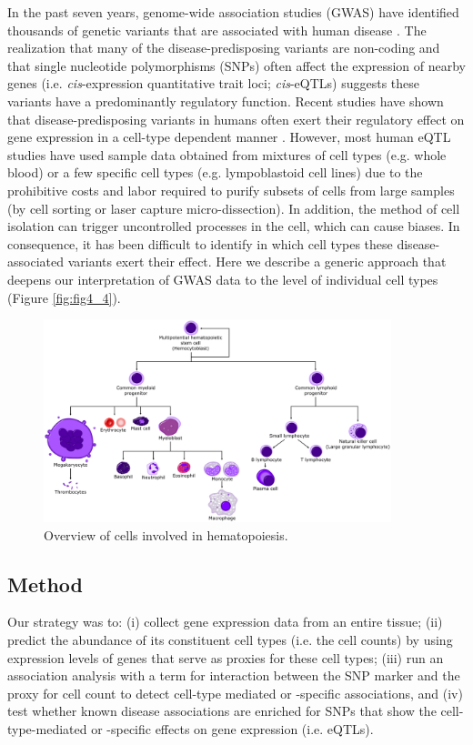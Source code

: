   In the past seven years, genome-wide association studies (GWAS) have identified thousands of genetic variants that are 
  associated with human disease \cite{Hindorff:2009}. The realization that many of the disease-predisposing variants are non-coding and that 
  single nucleotide polymorphisms (SNPs) often affect the expression of nearby genes (i.e. \emph{cis}-expression quantitative 
  trait loci; \emph{cis}-eQTLs)\cite{Lude:2011} suggests these variants have a predominantly regulatory function. Recent studies have shown 
  that disease-predisposing variants in humans often exert their regulatory effect on gene expression in a cell-type 
  dependent manner \cite{Brown:2013, Fairfax:2012, Fu:2012}. However, most human eQTL studies have used sample data obtained from mixtures of cell types (e.g. 
  whole blood) or a few specific cell types (e.g. lympoblastoid cell lines) due to the prohibitive costs and labor 
  required to purify subsets of cells from large samples (by cell sorting or laser capture micro-dissection). In addition, 
  the method of cell isolation can trigger uncontrolled processes in the cell, which can cause biases. In consequence, 
  it has been difficult to identify in which cell types these disease-associated variants exert their effect. 
  Here we describe a generic approach that deepens our interpretation of GWAS data to the level of individual cell types (Figure \ref{fig:fig4_4}). 

  \begin{figure}[h!]
  \centering
  \includegraphics[width=0.9\textwidth]{eps/image_4_3.eps}
  \caption[Hematopoiesis overview]{Overview of cells involved in hematopoiesis. }
          \label{fig:fig4_3}
  \end{figure}

  \subsection{Method}
  Our strategy was to: (i) collect gene expression data from an entire tissue; (ii) predict the abundance of its constituent 
  cell types (i.e. the cell counts) by using expression levels of genes that serve as proxies for these cell types; (iii) run 
  an association analysis with a term for interaction between the SNP marker and the proxy for cell count to detect cell-type 
  mediated or -specific associations, and (iv) test whether known disease associations are enriched for SNPs that show the 
  cell-type-mediated or -specific effects on gene expression (i.e. eQTLs).

